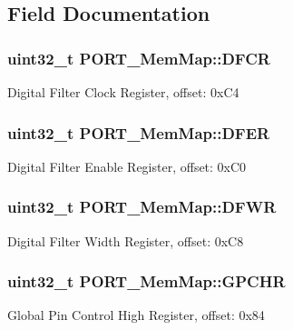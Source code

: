 \subsection{Field Documentation}
\hypertarget{struct_p_o_r_t___mem_map_a0d2552c73fb3c6ed5f336d7df1249151}{}
\subsubsection[{D\+F\+C\+R}]{\setlength{\rightskip}{0pt plus 5cm}uint32\+\_\+t P\+O\+R\+T\+\_\+\+Mem\+Map\+::\+D\+F\+C\+R}\label{struct_p_o_r_t___mem_map_a0d2552c73fb3c6ed5f336d7df1249151}
Digital Filter Clock Register, offset\+: 0x\+C4 \hypertarget{struct_p_o_r_t___mem_map_ad472de7afdaeef3985761041fe9023e2}{}
\subsubsection[{D\+F\+E\+R}]{\setlength{\rightskip}{0pt plus 5cm}uint32\+\_\+t P\+O\+R\+T\+\_\+\+Mem\+Map\+::\+D\+F\+E\+R}\label{struct_p_o_r_t___mem_map_ad472de7afdaeef3985761041fe9023e2}
Digital Filter Enable Register, offset\+: 0x\+C0 \hypertarget{struct_p_o_r_t___mem_map_a739d09875cabb44276b89977d36a19ed}{}
\subsubsection[{D\+F\+W\+R}]{\setlength{\rightskip}{0pt plus 5cm}uint32\+\_\+t P\+O\+R\+T\+\_\+\+Mem\+Map\+::\+D\+F\+W\+R}\label{struct_p_o_r_t___mem_map_a739d09875cabb44276b89977d36a19ed}
Digital Filter Width Register, offset\+: 0x\+C8 \hypertarget{struct_p_o_r_t___mem_map_a84f8893cbefd6a3eff18b455f9069b29}{}
\subsubsection[{G\+P\+C\+H\+R}]{\setlength{\rightskip}{0pt plus 5cm}uint32\+\_\+t P\+O\+R\+T\+\_\+\+Mem\+Map\+::\+G\+P\+C\+H\+R}\label{struct_p_o_r_t___mem_map_a84f8893cbefd6a3eff18b455f9069b29}
Global Pin Control High Register, offset\+: 0x84 \hypertarget{struct_p_o_r_t___mem_map_a837c289643f8cec958b1f01c086b558a}{}
